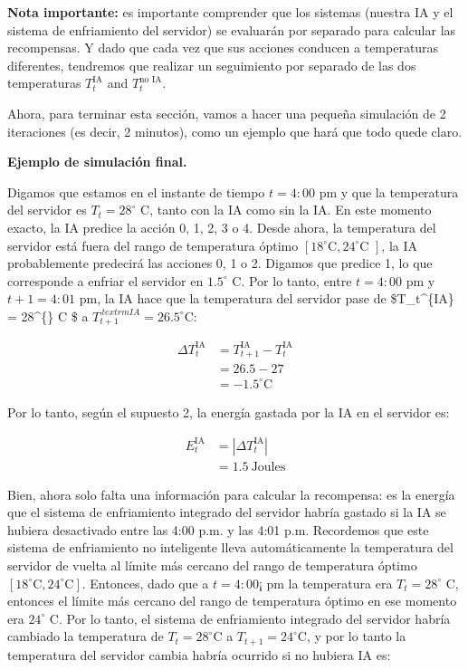 \documentclass[
]{book}
\begin{document}
\textbf{Nota importante:} es importante comprender que los sistemas (nuestra IA y el sistema de enfriamiento del servidor) se evaluarán por separado para calcular las recompensas. Y dado que cada vez que sus acciones conducen a temperaturas diferentes, tendremos que realizar un seguimiento por separado de las dos temperaturas \(T_t^{\textrm{IA}}\) and \(T_t^{\textrm{no IA}}\).

Ahora, para terminar esta sección, vamos a hacer una pequeña simulación de 2 iteraciones (es decir, 2 minutos), como un ejemplo que hará que todo quede claro.

\textbf{Ejemplo de simulación final.}

Digamos que estamos en el instante de tiempo \(t = 4:00\) pm y que la temperatura del servidor es \(T_t = 28^{\circ}\) C, tanto con la IA como sin la IA. En este momento exacto, la IA predice la acción 0, 1, 2, 3 o 4. Desde ahora, la temperatura del servidor está fuera del rango de temperatura óptimo \([18^{\circ} \textrm{C}, 24^{\circ} \textrm{C }]\), la IA probablemente predecirá las acciones 0, 1 o 2. Digamos que predice 1, lo que corresponde a enfriar el servidor en \(1.5^{\circ}\) C. Por lo tanto, entre \(t = 4:00\) pm y \(t + 1 = 4: 01\) pm, la IA hace que la temperatura del servidor pase de \$T\_t\^{}\{\textrm{IA}\} = 28\^{}\{\circ\} \textrm{C} \$ a \(T_{t + 1}^{\ textrm{IA}} = 26.5^{\circ} \textrm{C}\):

\begin{align*}
    \Delta T_t^{\textrm{IA}}
    & = T_{t+1}^{\textrm{IA}} - T_t^{\textrm{IA}} \\
    & = 26.5 - 27 \\
    & = -1.5^{\circ} \textrm{C}
\end{align*}

Por lo tanto, según el supuesto 2, la energía gastada por la IA en el servidor es:

\begin{align*}
    E_t^{\textrm{IA}}
    & = |\Delta T_t^{\textrm{IA}}| \\
    & = 1.5 \ \textrm{Joules}
\end{align*}

Bien, ahora solo falta una información para calcular la recompensa: es la energía que el sistema de enfriamiento integrado del servidor habría gastado si la IA se hubiera desactivado entre las 4:00 p.m. y las 4:01 p.m. Recordemos que este sistema de enfriamiento no inteligente lleva automáticamente la temperatura del servidor de vuelta al límite más cercano del rango de temperatura óptimo \([18^{\circ} \textrm{C}, 24^{\circ} \textrm{C}]\). Entonces, dado que a \(t = 4: 00 ¡\) pm la temperatura era \(T_t = 28^{\circ}\) C, entonces el límite más cercano del rango de temperatura óptimo en ese momento era \(24^{\circ}\) C. Por lo tanto, el sistema de enfriamiento integrado del servidor habría cambiado la temperatura de \(T_t = 28^{\circ} \textrm{C}\) a \(T_{t + 1} = 24^{\circ} \textrm{C}\), y por lo tanto la temperatura del servidor cambia habría ocurrido si no hubiera IA es:
\end{document}
